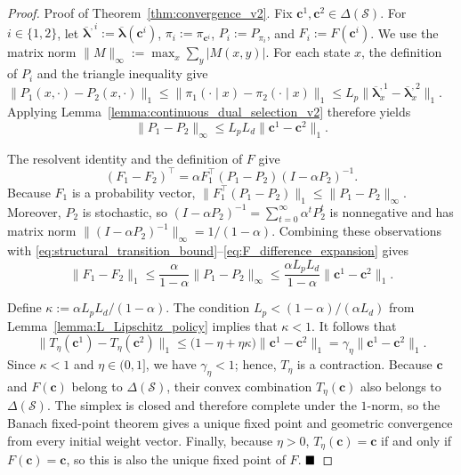 \documentclass[sglanonrev]{informs4}
\providecommand{\bc}{\boldsymbol{c}}
\providecommand{\blambda}{\boldsymbol{\lambda}}
\begin{document}
\begin{proof}{Proof of Theorem~\ref{thm:convergence_v2}.}
Fix $\bc^1,\bc^2\in\Delta(\mathcal S)$. For $i\in\{1,2\}$, let
$\overline{\blambda}^{,i}:=\overline{\blambda}(\bc^i)$,
$\pi_i:=\pi_{\bc^i}$, $P_i:=P_{\pi_i}$, and
$F_i:=F(\bc^i)$. We use the matrix norm
$\|M\|_\infty:=\max_x\sum_y|M(x,y)|$. For each state $x$, the
definition of $P_i$ and the triangle inequality give
$
\|P_1(x,\cdot)-P_2(x,\cdot)\|_1
\leq
\|\pi_1(\cdot\mid x)-\pi_2(\cdot\mid x)\|_1 
\leq
L_p\|\overline{\blambda}^{,1}_x-
\overline{\blambda}^{,2}_x\|_1.
$
Applying Lemma~\ref{lemma:continuous_dual_selection_v2} therefore yields
\begin{equation}
\label{eq:structural_transition_bound}
\|P_1-P_2\|_\infty
\leq
L_pL_d\|\bc^1-\bc^2\|_1.
\end{equation}

The resolvent identity and the definition of $F$ give
\begin{equation}
\label{eq:F_difference_expansion}
(F_1-F_2)^\top
=
\alpha F_1^\top(P_1-P_2)(I-\alpha P_2)^{-1}.
\end{equation}
Because $F_1$ is a probability vector,
$\|F_1^\top(P_1-P_2)\|_1\leq\|P_1-P_2\|_\infty$. Moreover, $P_2$ is
stochastic, so
$(I-\alpha P_2)^{-1}=\sum_{t=0}^\infty\alpha^tP_2^t$ is nonnegative and
has matrix norm $\|(I-\alpha P_2)^{-1}\|_\infty=1/(1-\alpha)$.
Combining these observations with
\eqref{eq:structural_transition_bound}--\eqref{eq:F_difference_expansion}
gives
\begin{equation}
\label{eq:compact_contraction_chain}
\|F_1-F_2\|_1
\leq
\frac{\alpha}{1-\alpha}\|P_1-P_2\|_\infty
\leq
\frac{\alpha L_pL_d}{1-\alpha}\|\bc^1-\bc^2\|_1.
\end{equation}

Define $\kappa:=\alpha L_pL_d/(1-\alpha)$. The condition
$L_p<(1-\alpha)/(\alpha L_d)$ from
Lemma~\ref{lemma:L_Lipschitz_policy} implies that $\kappa<1$.
It follows that
\begin{equation*}
\|T_\eta(\bc^1)-T_\eta(\bc^2)\|_1
\leq
\bigl(1-\eta+\eta\kappa\bigr)
\|\bc^1-\bc^2\|_1
=
\gamma_\eta\|\bc^1-\bc^2\|_1.
\end{equation*}
Since $\kappa<1$ and $\eta\in(0,1]$, we have $\gamma_\eta<1$; hence,
$T_\eta$ is a contraction. Because $\bc$ and $F(\bc)$ belong to
$\Delta(\mathcal S)$, their convex combination $T_\eta(\bc)$ also
belongs to $\Delta(\mathcal S)$. The simplex is closed and therefore
complete under the $1$-norm, so the Banach fixed-point theorem gives a
unique fixed point and geometric convergence from every initial weight
vector. Finally, because $\eta>0$, $T_\eta(\bc)=\bc$ if
and only if $F(\bc)=\bc$, so this is also the unique fixed point of $F$.
$\hfill\blacksquare$
\end{proof}
\end{document}
